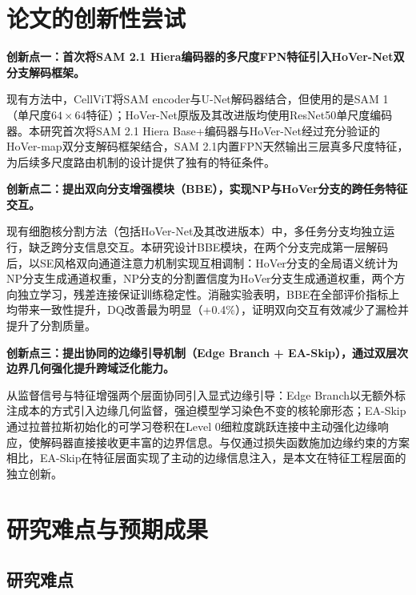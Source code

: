 \documentclass{sufethesismas}
\begin{document}
\chapter{论文的创新性尝试}

\textbf{创新点一：首次将SAM 2.1 Hiera编码器的多尺度FPN特征引入HoVer-Net双分支解码框架。}

现有方法中，CellViT\cite{Horst2024}将SAM encoder与U-Net解码器结合，但使用的是SAM 1（单尺度$64\times64$特征）；HoVer-Net原版\cite{Graham2019}及其改进版均使用ResNet50单尺度编码器。本研究首次将SAM 2.1 Hiera Base+编码器与HoVer-Net经过充分验证的HoVer-map双分支解码框架结合，SAM 2.1内置FPN天然输出三层真多尺度特征，为后续多尺度路由机制的设计提供了独有的特征条件。

\textbf{创新点二：提出双向分支增强模块（BBE），实现NP与HoVer分支的跨任务特征交互。}

现有细胞核分割方法（包括HoVer-Net及其改进版本）中，多任务分支均独立运行，缺乏跨分支信息交互。本研究设计BBE模块，在两个分支完成第一层解码后，以SE风格双向通道注意力机制实现互相调制：HoVer分支的全局语义统计为NP分支生成通道权重，NP分支的分割置信度为HoVer分支生成通道权重，两个方向独立学习，残差连接保证训练稳定性。消融实验表明，BBE在全部评价指标上均带来一致性提升，DQ改善最为明显（+0.4\%），证明双向交互有效减少了漏检并提升了分割质量。

\textbf{创新点三：提出协同的边缘引导机制（Edge Branch + EA-Skip），通过双层次边界几何强化提升跨域泛化能力。}

从监督信号与特征增强两个层面协同引入显式边缘引导：Edge Branch以无额外标注成本的方式引入边缘几何监督，强迫模型学习染色不变的核轮廓形态；EA-Skip通过拉普拉斯初始化的可学习卷积在Level 0细粒度跳跃连接中主动强化边缘响应，使解码器直接接收更丰富的边界信息。与仅通过损失函数施加边缘约束的方案相比，EA-Skip在特征层面实现了主动的边缘信息注入，是本文在特征工程层面的独立创新。


\chapter{研究难点与预期成果}

\section{研究难点}
\end{document}
